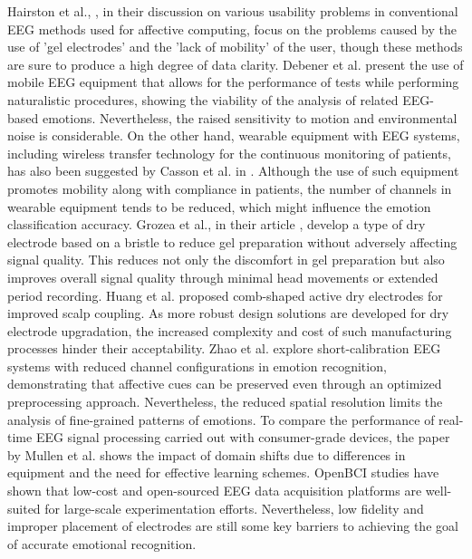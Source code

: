 \documentclass{WileyMSP-template}
\begin{document}
Hairston et al., \cite{hairston2014usability}, in their discussion on various usability problems in conventional EEG methods used for affective computing, focus on the problems caused by the use of 'gel electrodes' and the 'lack of mobility' of the user, though these methods are sure to produce a high degree of data clarity. Debener et al. \cite{debener2012mobile} present the use of mobile EEG equipment that allows for the performance of tests while performing naturalistic procedures, showing the viability of the analysis of related EEG-based emotions. Nevertheless, the raised sensitivity to motion and environmental noise is considerable. On the other hand, wearable equipment with EEG systems, including wireless transfer technology for the continuous monitoring of patients, has also been suggested by Casson et al. in \cite{casson2010wearable}. Although the use of such equipment promotes mobility along with compliance in patients, the number of channels in wearable equipment tends to be reduced, which might influence the emotion classification accuracy. Grozea et al., in their article \cite{grozea2011bristle}, develop a type of dry electrode based on a bristle to reduce gel preparation without adversely affecting signal quality. This reduces not only the discomfort in gel preparation but also improves overall signal quality through minimal head movements or extended period recording. 
Huang et al. \cite{huang2015comb} proposed comb-shaped active dry electrodes for improved scalp coupling. As more robust design solutions are developed for dry electrode upgradation, the increased complexity and cost of such manufacturing processes hinder their acceptability. Zhao et al. \cite{zhao2019calibration} explore short-calibration EEG systems with reduced channel configurations in emotion recognition, demonstrating that affective cues can be preserved even through an optimized preprocessing approach. Nevertheless, the reduced spatial resolution limits the analysis of fine-grained patterns of emotions. To compare the performance of real-time EEG signal processing carried out with consumer-grade devices, the paper by Mullen et al. \cite{mullen2015realtime} shows the impact of domain shifts due to differences in equipment and the need for effective learning schemes. OpenBCI studies \cite{openbci2013} have shown that low-cost and open-sourced EEG data acquisition platforms are well-suited for large-scale experimentation efforts. Nevertheless, low fidelity and improper placement of electrodes are still some key barriers to achieving the goal of accurate emotional recognition.
\end{document}
